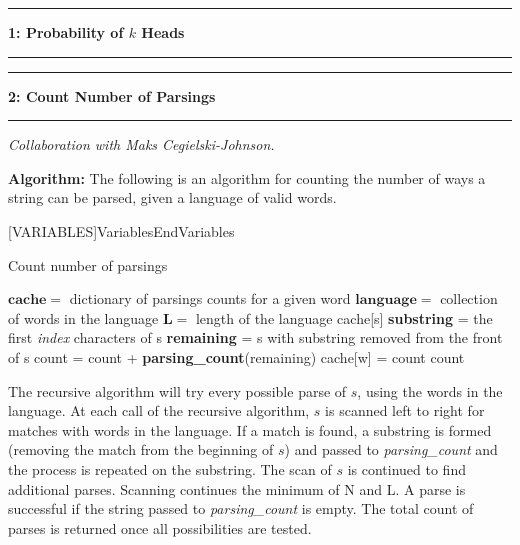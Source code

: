 \documentclass[11pt]{article}
\newcommand\question[2]{\vspace{.25in}\hrule\textbf{#1: #2}\vspace{.5em}\hrule\vspace{.10in}}
\newcommand\algorith{\vspace{.10in}\textbf{Algorithm: }}
\begin{document}
\raggedright
\newcommand\NAME{Jake Pitkin}  %
\newcommand\UID{u0891770}     %
\newcommand\HWNUM{2}              %

\question{1}{Probability of $k$ Heads}

\question{2}{Count Number of Parsings}
\textit{Collaboration with Maks Cegielski-Johnson.}

\algorith The following is an algorithm for counting the number of ways a string can be parsed, given a language of valid words.

[VARIABLES]{Variables}{EndVariables}
   {\algorithmicvariables}
   {\algorithmicend\ \algorithmicvariables}

\begin{algorithm}[H]
\caption{Count number of parsings}
\label{CHalgorithm}
\begin{algorithmic}[1]
\Variables
\State $\mathbf{cache} = $ dictionary of parsings counts for a given word
\State $\mathbf{language} =$ collection of words in the language
\State $\mathbf{L} =$ length of the language
\EndVariables
\State
{}
	\State {}
\EndIf
\State
{}
	\State \Return cache[s]
\EndIf
\State
{}
	\State \textbf{substring} = the first \textit{index} characters of s
		\State \textbf{remaining} = s with substring removed from the front of s
		\State count = count + \textbf{parsing\_count}(remaining)
	\EndIf
\EndFor
\State
\State cache[w] = count
\State \Return count
\EndProcedure
\end{algorithmic}
\end{algorithm}

The recursive algorithm will try every possible parse of $s$, using the words in the language. At each call of the recursive algorithm, $s$ is scanned left to right for matches with words in the language. If a match is found, a substring is formed (removing the match from the beginning of $s$) and passed to \textit{parsing\_count} and the process is repeated on the substring. The scan of $s$ is continued to find additional parses. Scanning continues the minimum of N and L. A parse is successful if the string passed to \textit{parsing\_count} is empty. The total count of parses is returned once all possibilities are tested.
\end{document}
